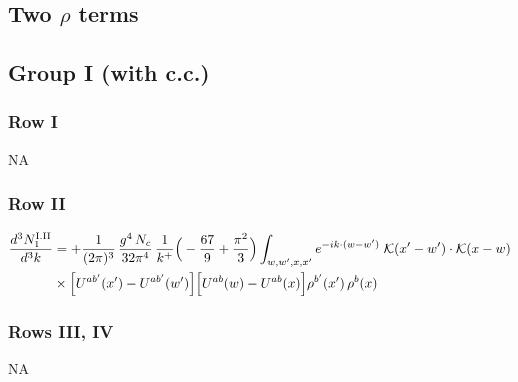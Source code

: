 \documentclass[9pt]{article}
\numberwithin{equation}{section}
\begin{document}
\subsection*{Two $\rho$ terms}
\subsection{Group I (with c.c.)}
\subsubsection*{Row I} \textsc{NA}
\subsubsection*{Row II}
\begin{align}
\frac{d^{3}N^{\rm I.II}_{1}}{d^{3}k} & = +\frac{1}{(2\pi)^{3}}\,\frac{g^{4}\,N_{c}}{32\pi^{4}}\,\frac{1}{k^{+}}\Big(-\frac{67}{9}+\frac{\pi^{2}}{3}\Big)\int_{w,w',x,x'} e^{-ik\cdot(w-w')}\;\mathcal{K}(x'-w')\cdot\mathcal{K}(x-w)\notag \\
& \times\Big[U^{ab'}(x')-U^{ab'}(w')\Big]\Big[U^{ab}(w)-U^{ab}(x)\Big]\rho^{b'}(x')\,\rho^{b}(x)\label{eq:B-I2a}
\end{align}
\subsubsection*{Rows III, IV} \textsc{NA}
\end{document}
